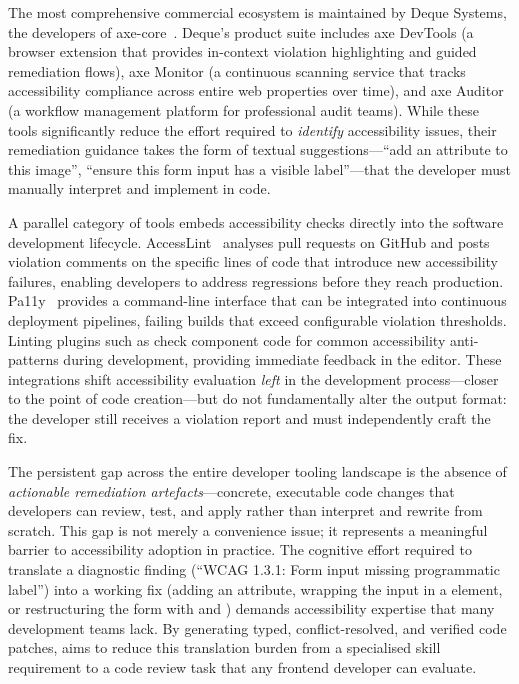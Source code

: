 The most comprehensive commercial ecosystem is maintained by Deque Systems, the developers of axe-core~\cite{axecore}. Deque's product suite includes axe DevTools (a browser extension that provides in-context violation highlighting and guided remediation flows), axe Monitor (a continuous scanning service that tracks accessibility compliance across entire web properties over time), and axe Auditor (a workflow management platform for professional audit teams). While these tools significantly reduce the effort required to \textit{identify} accessibility issues, their remediation guidance takes the form of textual suggestions---``add an  attribute to this image'', ``ensure this form input has a visible label''---that the developer must manually interpret and implement in code.

A parallel category of tools embeds accessibility checks directly into the software development lifecycle. AccessLint~\cite{accesslint} analyses pull requests on GitHub and posts violation comments on the specific lines of code that introduce new accessibility failures, enabling developers to address regressions before they reach production. Pa11y~\cite{pa11y} provides a command-line interface that can be integrated into continuous deployment pipelines, failing builds that exceed configurable violation thresholds. Linting plugins such as  check component code for common accessibility anti-patterns during development, providing immediate feedback in the editor. These integrations shift accessibility evaluation \textit{left} in the development process---closer to the point of code creation---but do not fundamentally alter the output format: the developer still receives a violation report and must independently craft the fix.

The persistent gap across the entire developer tooling landscape is the absence of \textit{actionable remediation artefacts}---concrete, executable code changes that developers can review, test, and apply rather than interpret and rewrite from scratch. This gap is not merely a convenience issue; it represents a meaningful barrier to accessibility adoption in practice. The cognitive effort required to translate a diagnostic finding (``WCAG 1.3.1: Form input missing programmatic label'') into a working fix (adding an  attribute, wrapping the input in a  element, or restructuring the form with  and ) demands accessibility expertise that many development teams lack. By generating typed, conflict-resolved, and verified code patches, \versimux{} aims to reduce this translation burden from a specialised skill requirement to a code review task that any frontend developer can evaluate.


